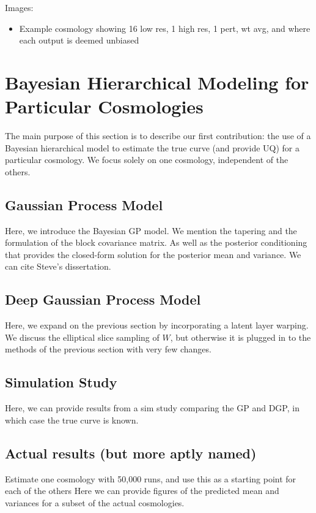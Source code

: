 \documentclass[11pt]{article}
\begin{document}
Images:
\begin{itemize}
    \item Example cosmology showing 16 low res, 1 high res, 1 pert, wt avg, and where each output is deemed unbiased
\end{itemize}

\section{Bayesian Hierarchical Modeling for Particular Cosmologies}

The main purpose of this section is to describe our first contribution: the use of a Bayesian hierarchical model to estimate the true curve (and provide UQ) for a particular cosmology.  We focus solely on one cosmology, independent of the others.

\subsection{Gaussian Process Model}

Here, we introduce the Bayesian GP model.  We mention the tapering and the formulation of the block covariance matrix.  As well as the posterior conditioning that provides the closed-form solution for the posterior mean and variance.  We can cite Steve's dissertation.

\subsection{Deep Gaussian Process Model}

Here, we expand on the previous section by incorporating a latent layer warping.  We discuss the elliptical slice sampling of $W$, but otherwise it is plugged in to the methods of the previous section with very few changes.

\subsection{Simulation Study}

Here, we can provide results from a sim study comparing the GP and DGP, in which case the true curve is known.

\subsection{Actual results (but more aptly named)}

Estimate one cosmology with 50,000 runs, and use this as a starting point for each of the others
Here we can provide figures of the predicted mean and variances for a subset of the actual cosmologies.
\end{document}
